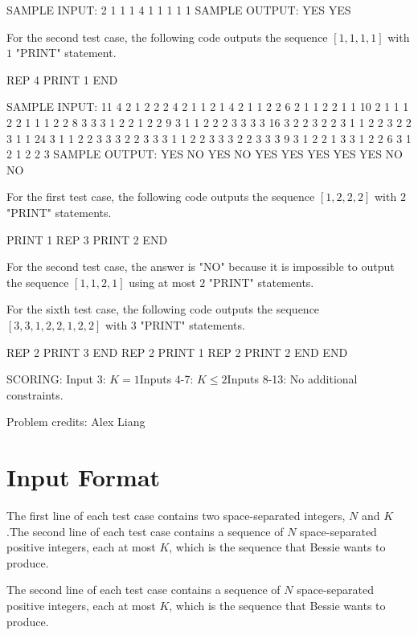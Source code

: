 \documentclass[12pt]{article}
\begin{document}
SAMPLE INPUT:
2
1 1
1
4 1
1 1 1 1
SAMPLE OUTPUT: 
YES
YES

For the second test case, the following code outputs the sequence $[1,1,1,1]$
with $1$ "PRINT" statement.


REP 4
    PRINT 1
END

SAMPLE INPUT:
11
4 2
1 2 2 2
4 2
1 1 2 1
4 2
1 1 2 2
6 2
1 1 2 2 1 1
10 2
1 1 1 2 2 1 1 1 2 2
8 3
3 3 1 2 2 1 2 2
9 3
1 1 2 2 2 3 3 3 3
16 3
2 2 3 2 2 3 1 1 2 2 3 2 2 3 1 1
24 3
1 1 2 2 3 3 3 2 2 3 3 3 1 1 2 2 3 3 3 2 2 3 3 3
9 3
1 2 2 1 3 3 1 2 2
6 3
1 2 1 2 2 3
SAMPLE OUTPUT: 
YES
NO
YES
NO
YES
YES
YES
YES
YES
NO
NO

For the first test case, the following code outputs the sequence $[1,2,2,2]$
with $2$ "PRINT" statements.


PRINT 1
REP 3
    PRINT 2
END

For the second test case, the answer is "NO" because it is impossible to output
the sequence $[1,1,2,1]$ using at most $2$ "PRINT" statements.

For the sixth test case, the following code outputs the sequence
$[3,3,1,2,2,1,2,2]$ with $3$ "PRINT" statements.


REP 2
    PRINT 3
END
REP 2
    PRINT 1
    REP 2
        PRINT 2
    END
END

SCORING:
Input 3: $K=1$Inputs 4-7: $K \le 2$Inputs 8-13: No
additional constraints.


Problem credits: Alex Liang



\section*{Input Format}
The first line of each test case contains two space-separated integers, $N$ and
$K$.The second line of each test case contains a sequence of $N$ space-separated
positive integers,  each at most $K$, which is the sequence that Bessie wants to
produce.

The second line of each test case contains a sequence of $N$ space-separated
positive integers,  each at most $K$, which is the sequence that Bessie wants to
produce.
\end{document}
